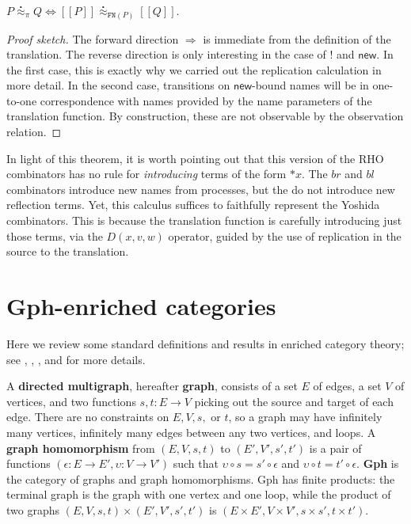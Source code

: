 \documentclass{llncs}
\newcommand{\maps}{\colon}
\newcommand{\ldb}{[\![}
\newcommand{\rdb}{]\!]}
\newcommand{\wbbisim}{\stackrel{\centerdot}{\approx}} %
\newcommand{\dropn}[1]{\mathsf{*}#1}
\begin{document}
\begin{theorem}
  $P \wbbisim_{\pi} Q \iff \ldb P \rdb \wbbisim_{\texttt{FN}(P)} \ldb Q \rdb$.
\end{theorem}

\begin{proof}[Proof sketch]
  The forward direction $\Rightarrow$ is immediate from the definition
  of the translation. The reverse direction is only interesting in the
  case of $!$ and $\mathsf{new}$. In the first case, this is
  exactly why we carried out the replication calculation in more
  detail. In the second case, transitions on $\mathsf{new}$-bound
  names will be in one-to-one correspondence with names provided by
  the name parameters of the translation function. By construction,
  these are not observable by the observation relation.
\end{proof}

\begin{remark}
  In light of this theorem, it is worth pointing out that this version
  of the RHO combinators has no rule for \emph{introducing} terms of
  the form $\dropn{x}$. The $br$ and $bl$ combinators introduce new
  names from processes, but the do not introduce new reflection
  terms. Yet, this calculus suffices to faithfully represent the
  Yoshida combinators. This is because the translation function is
  carefully introducing just those terms, via the $D(x,v,w)$ operator,
  guided by the use of replication in the source to the
  translation. 
\end{remark}

\section{Gph-enriched categories}
Here we review some standard definitions and results in enriched category theory; see \cite{CIS-335497}, \cite{Power99EnrichedLawvereTheories}, \cite{DBLP:journals/acs/LackR11}, and \cite{Trimble} for more details.

A {\bf directed multigraph}, hereafter {\bf graph}, consists of a set $E$ of edges, a set $V$ of vertices, and two functions $s,t\maps E \to V$ picking out the source and target of each edge.  There are no constraints on $E, V, s,$ or $t$, so a graph may have infinitely many vertices, infinitely many edges between any two vertices, and loops.  A {\bf graph homomorphism} from $(E, V, s, t)$ to $(E', V', s', t')$ is a pair of functions $(\epsilon\maps E \to E', \upsilon\maps V \to V')$ such that $\upsilon\circ s = s' \circ \epsilon$ and $\upsilon\circ t = t' \circ \epsilon$.  {\bf Gph} is the category of graphs and graph homomorphisms.  Gph has finite products: the terminal graph is the graph with one vertex and one loop, while the product of two graphs $(E, V, s, t) \times (E', V', s', t')$ is $(E \times E', V \times V', s \times s', t\times t').$
\end{document}
